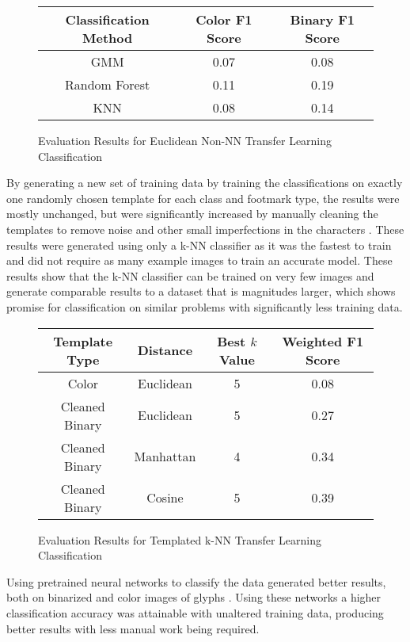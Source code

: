 \begin{figure}[H]
    \caption{Evaluation Results for Euclidean Non-NN Transfer Learning Classification}
    \label{fig:classificationEuclideanNonNN}
    \centering
    \begin{tabular}{ | c | c | c | }
        \hline
        Classification Method & Color F1 Score & Binary F1 Score \\
        \hline
        GMM & 0.07 & 0.08 \\
        Random Forest & 0.11 & 0.19 \\
        KNN & 0.08 & 0.14 \\
        \hline
    \end{tabular}
\end{figure}

By generating a new set of training data by training the classifications on exactly one randomly chosen template for each class and footmark type, the results were mostly unchanged, but were significantly increased by manually cleaning the templates to remove noise and other small imperfections in the characters . These results were generated using only a k-NN classifier as it was the fastest to train and did not require as many example images to train an accurate model. These results show that the k-NN classifier can be trained on very few images and generate comparable results to a dataset that is magnitudes larger, which shows promise for classification on similar problems with significantly less training data.

\begin{figure}[H]
    \caption{Evaluation Results for Templated k-NN Transfer Learning Classification}
    \label{fig:classificationKNNTemplates}
    \centering
    \begin{tabular}{ | c | c | c | c | }
        \hline
        Template Type & Distance & Best $k$ Value & Weighted F1 Score \\
        \hline
        Color & Euclidean & 5 & 0.08 \\
        Cleaned Binary & Euclidean & 5 & 0.27 \\
        Cleaned Binary & Manhattan & 4 & 0.34 \\
        Cleaned Binary & Cosine & 5 & 0.39 \\
        \hline
    \end{tabular}
\end{figure}

Using pretrained neural networks to classify the data generated better results, both on binarized and color images of glyphs . Using these networks a higher classification accuracy was attainable with unaltered training data, producing better results with less manual work being required.


